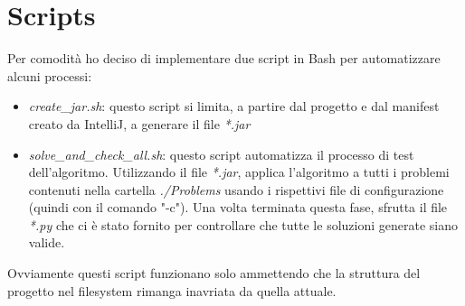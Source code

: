 \chapter*{Scripts}
\label{cha_scripts}

Per comodità ho deciso di implementare due script in Bash per automatizzare alcuni processi:
\begin{itemize}
	\item \emph{create\_jar.sh}: questo script si limita, a partire dal progetto e dal manifest creato da IntelliJ, a generare il file \emph{*.jar}
	\item \emph{solve\_and\_check\_all.sh}: questo script automatizza il processo di test dell'algoritmo. Utilizzando il file \emph{*.jar}, applica l'algoritmo a tutti i problemi contenuti nella cartella \emph{./Problems} usando i rispettivi file di configurazione (quindi con il comando "-c"). Una volta terminata questa fase, sfrutta il file \emph{*.py} che ci è stato fornito per controllare che tutte le soluzioni generate siano valide.
\end{itemize}
Ovviamente questi script funzionano solo ammettendo che la struttura del progetto nel filesystem rimanga inavriata da quella attuale.
